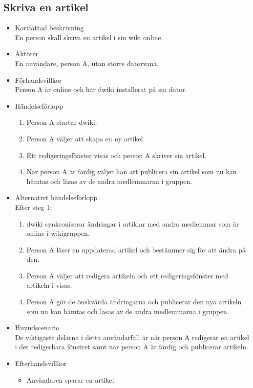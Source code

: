 \subsection{Skriva en artikel}
\begin{itemize}
	\item Kortfattad beskrivning
	\\En person skall skriva en artikel i sin wiki online.
	\item Aktörer
	\\En användare, person A, utan större datorvana.
	\item Förhandsvillkor
	\\Person A är online och har dwiki installerat på sin dator.
	\item Händelseförlopp
	\begin{enumerate}
		\item Person A startar dwiki.
		\item Person A väljer att skapa en ny artikel.
		\item Ett redigeringsfönster visas och person A skriver sin artikel.
		\item När person A är färdig väljer han att publicera sin artikel som nu kan hämtas och läsas av de andra medlemmarna i gruppen.
	\end{enumerate}
	\item Alternativt händelseförlopp
	\\Efter steg 1:
	\begin{enumerate}	
		\item dwiki synkroniserar ändringar i artiklar med andra medlemmar som är online i wikigruppen.
		\item Person A läser en uppdaterad artikel och bestämmer sig för att ändra på den.
		\item Person A väljer att redigera artikeln och ett redigeringsfönster med artikeln i visas.
		\item Person A gör de önskvärda ändringarna	och publicerar den nya artikeln	som nu kan hämtas och läsas av de andra medlemmarna i gruppen.
	\end{enumerate}
	\item Huvudscenario
	\\De viktigaste delarna i detta användarfall är när person A redigerar en artikel i det redigerbara fönstret samt när person A är färdig och publicerar artikeln.
	\item Efterhandsvillkor
	\begin{itemize}
		\item Användaren sparar en artikel

\end{itemize}
\end{itemize}
